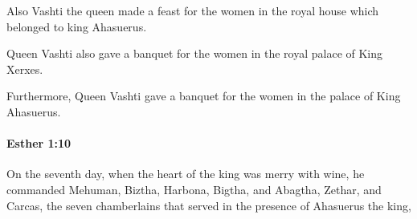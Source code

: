 			\begin{versebox}
					\item[BHS] 
					\item[LXX] 
					\item[ASV] Also Vashti the queen made a feast for the women in the royal house which belonged to king Ahasuerus.
					\item[NIV] Queen Vashti also gave a banquet for the women in the royal palace of King Xerxes.
					\item[NRSV] Furthermore, Queen Vashti gave a banquet for the women in the palace of King Ahasuerus.
			\end{versebox}

		\paragraph{Esther 1:10} %
			\label{ESTHER-1-10}

			On the seventh day, when the heart of the king was merry with wine, he commanded Mehuman, Biztha, Harbona, Bigtha, and Abagtha, Zethar, and Carcas, the seven chamberlains that served in the presence of Ahasuerus the king,


